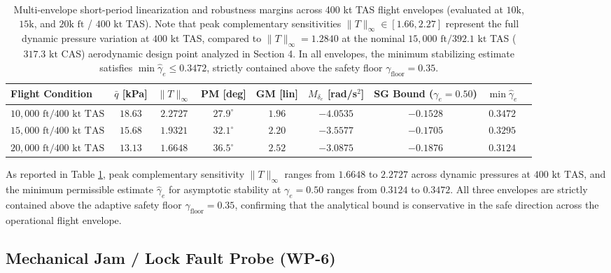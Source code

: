 \documentclass[review,12pt]{elsarticle}
\begin{document}
\begin{table}[!htbp]
\centering
\caption{Multi-envelope short-period linearization and robustness margins across 400 kt TAS flight envelopes (evaluated at $10\text{k}$, $15\text{k}$, and $20\text{k}\text{ ft}$ / $400\text{ kt}$ TAS). Note that peak complementary sensitivities $\|T\|_\infty \in [1.66, 2.27]$ represent the full dynamic pressure variation at $400\text{ kt}$ TAS, compared to $\|T\|_\infty = 1.2840$ at the nominal $15{,}000\text{ ft} / 392.1\text{ kt}$ TAS ($317.3\text{ kt}$ CAS) aerodynamic design point analyzed in Section 4. In all envelopes, the minimum stabilizing estimate satisfies $\min \hat{\gamma}_e \le 0.3472$, strictly contained above the safety floor $\gamma_{\text{floor}} = 0.35$.}
\label{tab:multienvelope}
\scriptsize
\setlength{\tabcolsep}{4pt}
\begin{adjustbox}{max width=\textwidth}
\begin{tabular}{lcccccccc}
\toprule
Flight Condition & $\bar{q}$ [kPa] & $\|T\|_\infty$ & PM [deg] & GM [lin] & $M_{\delta_e}$ [rad/s$^2$] & SG Bound ($\gamma_e=0.50$) & $\min \hat{\gamma}_e$ \\
\midrule
$10{,}000\text{ ft} / 400\text{ kt TAS}$ & $18.63$ & $2.2727$ & $27.9^\circ$ & $1.96$ & $-4.0535$ & $-0.1528$ & $0.3472$ \\
$15{,}000\text{ ft} / 400\text{ kt TAS}$ & $15.68$ & $1.9321$ & $32.1^\circ$ & $2.20$ & $-3.5577$ & $-0.1705$ & $0.3295$ \\
$20{,}000\text{ ft} / 400\text{ kt TAS}$ & $13.13$ & $1.6648$ & $36.5^\circ$ & $2.52$ & $-3.0875$ & $-0.1876$ & $0.3124$ \\
\bottomrule
\end{tabular}
\end{adjustbox}
\end{table}

As reported in Table \ref{tab:multienvelope}, peak complementary sensitivity $\|T\|_\infty$ ranges from $1.6648$ to $2.2727$ across dynamic pressures at $400\text{ kt TAS}$, and the minimum permissible estimate $\hat{\gamma}_e$ for asymptotic stability at $\gamma_e = 0.50$ ranges from $0.3124$ to $0.3472$. All three envelopes are strictly contained above the adaptive safety floor $\gamma_{\text{floor}} = 0.35$, confirming that the analytical bound is conservative in the safe direction across the operational flight envelope.

\subsection{Mechanical Jam / Lock Fault Probe (WP-6)}
\label{sec:wp6_jam}
\end{document}

